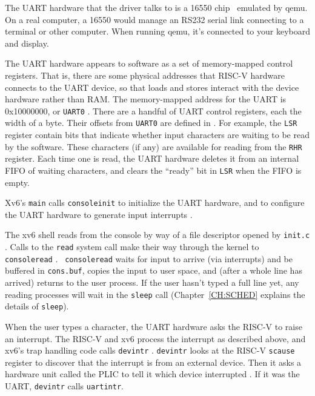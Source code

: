 The UART hardware that the driver talks to is a 16550
chip~\cite{ns16550a} emulated by qemu. On a real computer, a 16550
would manage an RS232 serial link connecting to a terminal or other
computer. When running qemu, it's connected to your keyboard and
display.

The UART hardware appears to software as a set of memory-mapped
control registers. That is, there are some physical addresses that 
RISC-V hardware connects to the UART device, so that loads and stores
interact with the device hardware rather than RAM.
The memory-mapped address for the UART is 0x10000000, or {\tt UART0}
.
There are a handful of UART control registers, each the width
of a byte. Their offsets from {\tt UART0} are defined in
. For example, the
{\tt LSR} register contain bits that indicate whether input
characters are waiting to be read by the software. These
characters (if any) are available for reading from the
{\tt RHR} register. Each time one is read, the UART hardware
deletes it from an internal FIFO of waiting characters, and
clears the ``ready'' bit in {\tt LSR} when the FIFO is empty.

Xv6's {\tt main} calls {\tt consoleinit}
 to initialize the UART
hardware, and to configure the UART hardware to generate input
interrupts .

The xv6 shell reads from the console by way of a file descriptor
opened by {\tt init.c} . Calls to
the {\tt read} system call make their way through the kernel to {\tt
  consoleread} . {\tt
  consoleread} waits for input to arrive (via interrupts) and be
buffered in {\tt cons.buf}, copies the input to user space, and (after
a whole line has arrived) returns to the user process. If the user
hasn't typed a full line yet, any reading processes will wait in the
{\tt sleep} call
(Chapter~\ref{CH:SCHED} explains the details of {\tt sleep}).

When the user types a character, the UART hardware asks the RISC-V
to raise an interrupt. The RISC-V and xv6 process the interrupt
as described above, and xv6's trap handling code calls {\tt devintr}
.
{\tt devintr} looks at the RISC-V {\tt scause} register to discover that
the interrupt is from an external device.
Then it asks a hardware unit called the PLIC
\cite{riscv:priv}
to tell it which device interrupted
.
If it was the UART, {\tt devintr} calls {\tt uartintr}.

